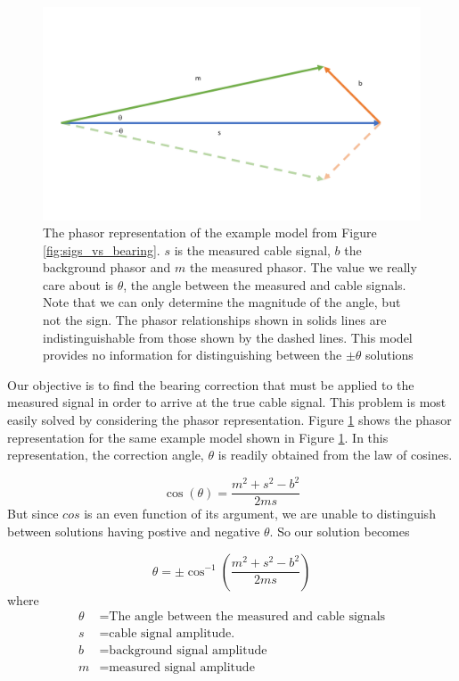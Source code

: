 \documentclass[paper=a4, fontsize=11pt]{scrartcl}
\numberwithin{equation}{section}		%
\numberwithin{figure}{section}			%
\numberwithin{table}{section}				%
\begin{document}
\begin{appendices}
\begin{figure}
  \caption{
  The phasor representation of the example model from Figure \ref{fig:sigs_vs_bearing}. $s$ is the measured cable signal, $b$ the background phasor and $m$ the measured phasor.  The value we really care about is $\theta$, the angle between the measured and cable signals.  Note that we can only determine the magnitude of the angle, but not the sign.  The phasor relationships shown in solids lines are indistinguishable from those shown by the dashed lines.  This model provides no information for distinguishing between the $\pm\theta$ solutions}
  \label{fig:phasor_base}
  \centering
  \includegraphics[width=1.0\textwidth]{figures/phasor_base.pdf}
\end{figure}

\par Our objective is to find the bearing correction that must be applied to the measured signal in order to arrive at the true cable signal.  This problem is most easily solved by considering the phasor representation.  Figure \ref{fig:phasor_base} shows the phasor representation for the same example model shown in Figure \ref{fig:phasor_base}.  In this representation, the correction angle, $\theta$ is readily obtained from the law of cosines.

\begin{equation} \label{eq:law_of_cos}
    \cos\left(\theta\right) = \frac{m^2 + s^2 - b^2}{2ms}
\end{equation}
But since $cos$ is an even function of its argument, we are unable to distinguish between solutions having postive and negative $\theta$.  So our solution becomes

\begin{equation} \label{eq:theta_solution}
\theta = \pm \cos^{-1}\left(\frac{m^2 + s^2 - b^2}{2ms}\right)
\end{equation}
where
\begin{align*}
        \theta &= \text{The angle between the measured and cable signals}\\
        s &= \text{cable signal amplitude.}\\
        b &= \text{background signal amplitude} \\
        m &= \text{measured signal amplitude} \\
\end{align*}




\end{appendices}
\end{document}

